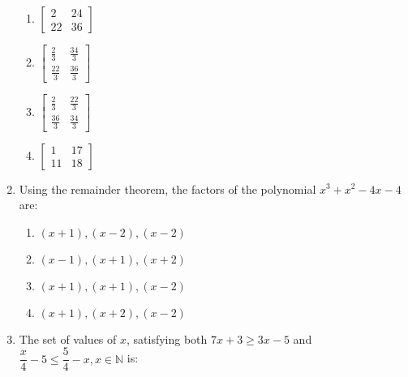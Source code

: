 \begin{enumerate}[label=(\roman*)]
        \begin{multicols}{2}
        \begin{enumerate}[label=(\alph*)]
            \item $\begin{bmatrix*} 2 & 24 \\ 22 & 36 \end{bmatrix*}$
            \item $\begin{bmatrix*} \frac{2}{3} & \frac{34}{3} \\ \frac{22}{3} & \frac{36}{3} \end{bmatrix*}$
            \item $\begin{bmatrix*} \frac{2}{3} & \frac{22}{3} \\ \frac{36}{3} & \frac{34}{3} \end{bmatrix*}$
            \item $\begin{bmatrix*} 1 & 17 \\ 11 & 18 \end{bmatrix*}$
        \end{enumerate}
        \end{multicols}

    \item Using the remainder theorem, the factors of the polynomial
        $x^3 + x^2 - 4x - 4$ are:

        \begin{multicols}{2}
        \begin{enumerate}[label=(\alph*)]
            \item $(x+1),(x-2),(x-2)$ 
            \item $(x-1),(x+1),(x+2)$ 
            \item $(x+1),(x+1),(x-2)$ 
            \item $(x+1),(x+2),(x-2)$ 
        \end{enumerate}
        \end{multicols}

    \item The set of values of $x$, satisfying both $7x + 3 \geq 3x - 5$ and 
        $\dfrac{x}{4} - 5 \leq \dfrac{5}{4} - x, x \in \mathbb{N}$ is:


\end{enumerate}
